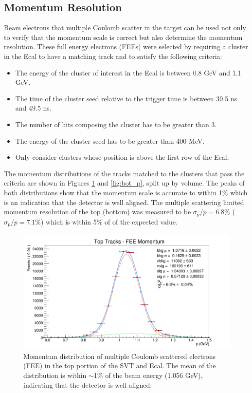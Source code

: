 \subsection{Momentum Resolution}

Beam electrons that multiple Coulomb scatter in the target can be used  
not only to verify that the momentum scale is correct but also determine the 
momentum resolution.  These full energy electrons (FEEs) 
were selected by requiring a cluster in the Ecal to have a matching track and
to satisfy the following criteria:
\begin{itemize}
    \item The energy of the cluster of interest in the Ecal  is between 0.8 GeV
          and 1.1 GeV.
    \item The time of the cluster seed relative to the trigger time is between
          39.5 ns and 49.5 ns.
    \item The number of hits composing the cluster has to be greater than 3.
    \item The energy of the cluster seed has to be greater than 400 MeV.
    \item Only consider clusters whose position is above the first row of the 
          Ecal.
\end{itemize}
The momentum distributions of the tracks matched to the clusters that pass the
criteria are shown in Figures \ref{fig:top_p} and \ref{fig:bot_p}, split up by volume.  The peaks
of both distributions show that the momentum scale is accurate to within 1\% 
which is an indication that the detector is well aligned.  The 
multiple scattering limited momentum resolution of the top (bottom) was measured
to be $\sigma_{p}/p = 6.8\%$ ($\sigma_{p}/p = 7.1\%$) which 
is within 5\% of of the expected value.
\begin{figure}[h!t]
    \centering
    \includegraphics[width=.95\textwidth]{images/20160424_fee_top_tracks_p.png}
    \caption{Momentum distribution of multiple Coulomb scattered electrons (FEE) in
             the top portion of the SVT and Ecal. 
             The mean of the distribution 
             is within $\sim$1\% of the beam energy (1.056 GeV), indicating that 
             the detector is well aligned.}
    \label{fig:top_p}
\end{figure}
